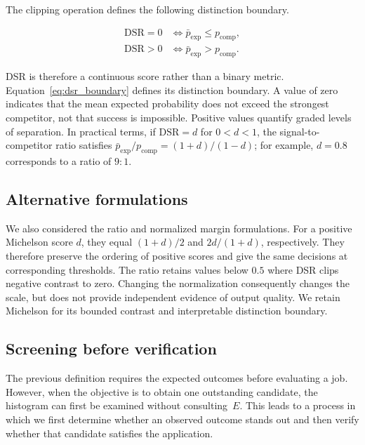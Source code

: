 \documentclass[pdflatex,sn-mathphys-num]{sn-jnl}
\theoremstyle{thmstyleone}%
\theoremstyle{thmstyletwo}%
\theoremstyle{thmstylethree}%
\begin{document}
The clipping operation defines the following distinction boundary.

\begin{equation}
\label{eq:dsr_boundary}
\begin{aligned}
\mathrm{DSR}=0
&\iff \bar{p}_{\mathrm{exp}} \leq p_{\mathrm{comp}},\\
\mathrm{DSR}>0
&\iff \bar{p}_{\mathrm{exp}} > p_{\mathrm{comp}}.
\end{aligned}
\end{equation}

DSR is therefore a continuous score rather than a binary metric. Equation~\eqref{eq:dsr_boundary} defines its distinction boundary. A value of zero indicates that the mean expected probability does not exceed the strongest competitor, not that success is impossible. Positive values quantify graded levels of separation. In practical terms, if $\mathrm{DSR}=d$ for $0<d<1$, the signal-to-competitor ratio satisfies $\bar{p}_{\mathrm{exp}}/p_{\mathrm{comp}}=(1+d)/(1-d)$; for example, $d=0.8$ corresponds to a ratio of $9{:}1$.

\subsection{Alternative formulations}

We also considered the ratio and normalized margin formulations. For a positive Michelson score $d$, they equal $(1+d)/2$ and $2d/(1+d)$, respectively. They therefore preserve the ordering of positive scores and give the same decisions at corresponding thresholds. The ratio retains values below $0.5$ where DSR clips negative contrast to zero. Changing the normalization consequently changes the scale, but does not provide independent evidence of output quality. We retain Michelson for its bounded contrast and interpretable distinction boundary.

\subsection{Screening before verification}\label{subsec:two-step}

The previous definition requires the expected outcomes before evaluating a job. However, when the objective is to obtain one outstanding candidate, the histogram can first be examined without consulting~$E$. This leads to a process in which we first determine whether an observed outcome stands out and then verify whether that candidate satisfies the application.
\end{document}
